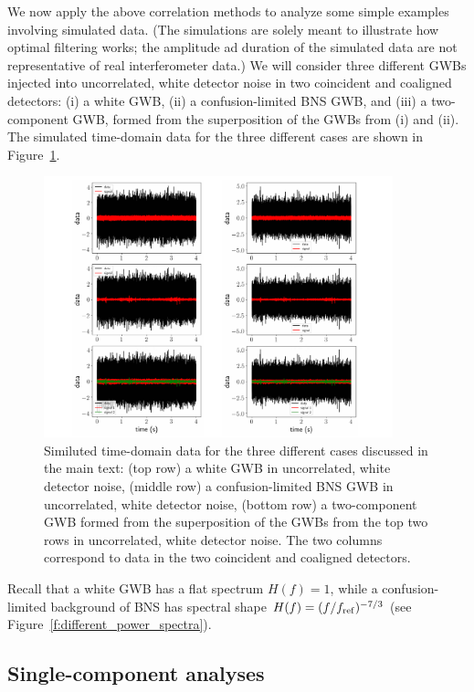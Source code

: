 We now apply the above correlation methods to analyze 
some simple examples involving simulated data.%
(The simulations are solely meant to illustrate how 
optimal filtering works;
the amplitude ad duration of the simulated data are 
not representative of real interferometer data.)
We will consider three different GWBs injected into 
uncorrelated, white detector noise in two coincident
and coaligned detectors:
(i) a white GWB, 
(ii) a confusion-limited BNS GWB, 
and 
(iii) a two-component GWB, formed from the superposition
of the GWBs from (i) and (ii).
The simulated time-domain data for the three different 
cases are shown in Figure~\ref{f:simple_examples}.
%
\begin{figure}[htbp!]
\begin{center}
\includegraphics[width=0.9\textwidth]{Figures/simple_examples}
\caption{Similuted time-domain data for the three different
cases discussed in the main text:
(top row) a white GWB in uncorrelated, white detector noise,
(middle row) a confusion-limited BNS GWB in uncorrelated, 
white detector noise,
(bottom row) a two-component GWB formed from the superposition 
of the GWBs from the top two rows in uncorrelated, white 
detector noise.
The two columns correspond to data in the two coincident
and coaligned detectors.}
\label{f:simple_examples}
\end{center}
\end{figure}
%
Recall that a white GWB has a flat spectrum $H(f)=1$, 
while a confusion-limited background of BNS has 
spectral shape $H(f)=(f/f_{\rm ref})^{-7/3}$ 
(see Figure~\ref{f:different_power_spectra}).

\subsection{Single-component analyses}


